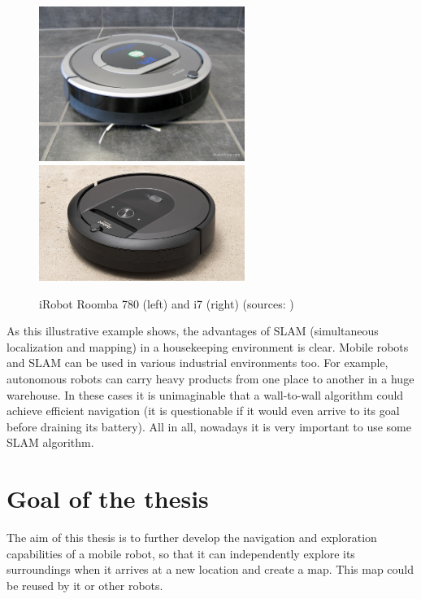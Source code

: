 \begin{figure}[H]
	\centering
	\includegraphics[width=67mm, keepaspectratio]{figures/iRobot_roomba_780.jpg}\hspace{1cm}
	\includegraphics[width=67mm, keepaspectratio]{figures/iRobot_roomba_i7.jpg}\\\vspace{5mm}
	\caption{iRobot Roomba 780 (left) and i7 (right) (sources: \cite{roomba780}\cite{roombai7})}
	\label{fig:Roombas}
\end{figure}

As this illustrative example shows, the advantages of SLAM (simultaneous localization and mapping) in a housekeeping environment is clear. Mobile robots and SLAM can be used in various industrial environments too. For example, autonomous robots can carry heavy products from one place to another in a huge warehouse. In these cases it is unimaginable that a wall-to-wall algorithm could achieve efficient navigation (it is questionable if it would even arrive to its goal before draining its battery). All in all, nowadays it is very important to use some SLAM algorithm.

\section{Goal of the thesis}

The aim of this thesis is to further develop the navigation and exploration capabilities of a mobile robot, so that it can independently explore its surroundings when it arrives at a new location and create a map. This map could be reused by it or other robots.

